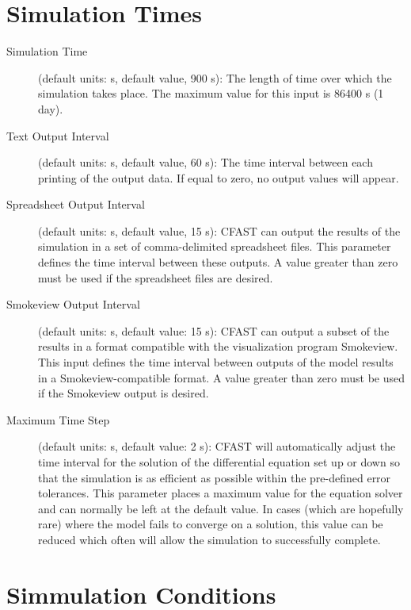 \section{Simulation Times}
\label{info:TIME}

\begin{description}
\item[Simulation Time] (default units: s, default value, 900 s): The length of time over which the simulation takes place. The maximum value for this input is 86400 s (1 day).

\item[Text Output Interval] (default units: s, default value, 60 s): The time interval between each printing of the output data.  If equal to zero, no output values will appear.

\item[Spreadsheet Output Interval] (default units: s, default value, 15 s): CFAST can output the results of the simulation in a set of comma-delimited spreadsheet files. This parameter defines the time interval between these outputs. A value greater than zero must be used if the spreadsheet files are desired.

\item[Smokeview Output Interval] (default units: s, default value: 15 s): CFAST can output a subset of the results in a format compatible with the visualization program Smokeview. This input defines the time interval between outputs of the model results in a Smokeview-compatible format.  A value greater than zero must be used if the Smokeview output is desired.

\item[Maximum Time Step] (default units: s, default value: 2 s): CFAST will automatically adjust the time interval for the solution of the differential equation set up or down so that the simulation is as efficient as possible within the pre-defined error tolerances. This parameter places a maximum value for the equation solver and can normally be left at the default value. In cases (which are hopefully rare) where the model fails to converge on a solution, this value can be reduced which often will allow the simulation to successfully complete.
\end{description}




\section{Simmulation Conditions}
\label{info:INIT}

